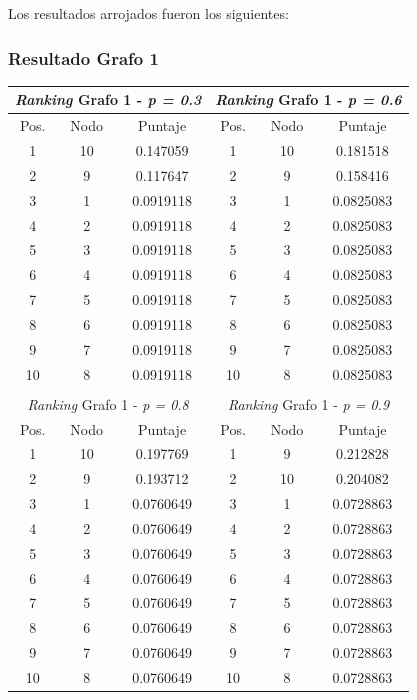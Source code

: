 Los resultados arrojados fueron los siguientes:

\subsubsection{Resultado Grafo 1}
\begin{center}
         \begin{tabular}{|c|c|c||c|c|c|}
                    \hline
                    \multicolumn{3}{|c||}{\emph{Ranking} Grafo 1 - \emph{p = 0.3}} & \multicolumn{3}{c|}{\emph{Ranking} Grafo 1 - \emph{p = 0.6}} \\ \hline
                    Pos. & Nodo & Puntaje    & Pos. & Nodo & Puntaje  \\ \hline
1 & 10 & 0.147059 & 1 & 10 &  0.181518 \\ 
2 & 9 & 0.117647 & 2 & 9 &  0.158416 \\
3 & 1 & 0.0919118 & 3 & 1 & 0.0825083 \\
4 & 2 & 0.0919118 & 4 & 2 & 0.0825083 \\
5 & 3 & 0.0919118 & 5 & 3 & 0.0825083 \\
6 & 4 & 0.0919118 & 6 & 4 & 0.0825083 \\
7 & 5 & 0.0919118 & 7 & 5 & 0.0825083 \\
8 & 6 & 0.0919118 & 8 & 6 & 0.0825083 \\
9 & 7 & 0.0919118 & 9 & 7 & 0.0825083 \\
10 & 8 & 0.0919118 & 10 & 8  & 0.0825083 \\ \hline
                    \multicolumn{6}{c}{} \\ \hline
                    \multicolumn{3}{|c||}{\emph{Ranking} Grafo 1 - \emph{p = 0.8}} & \multicolumn{3}{c|}{\emph{Ranking} Grafo 1 - \emph{p = 0.9}} \\ \hline
                    Pos. & Nodo & Puntaje    & Pos. & Nodo & Puntaje  \\ \hline
1 & 10 & 0.197769  & 1 & 9 &  0.212828 \\ 
2 & 9 & 0.193712  & 2 & 10 &  0.204082 \\
3 & 1 & 0.0760649  & 3 & 1 & 0.0728863 \\
4 & 2 & 0.0760649  & 4 & 2 & 0.0728863 \\
5 & 3 & 0.0760649  & 5 & 3 & 0.0728863 \\
6 & 4 & 0.0760649  & 6 & 4 & 0.0728863 \\
7 & 5 & 0.0760649  & 7 & 5 & 0.0728863 \\
8 & 6 & 0.0760649  & 8 & 6 & 0.0728863 \\
9 & 7 & 0.0760649  & 9 & 7 & 0.0728863 \\
10 & 8 & 0.0760649 & 10 & 8  & 0.0728863 \\ \hline

                \end{tabular}
            \end{center}

